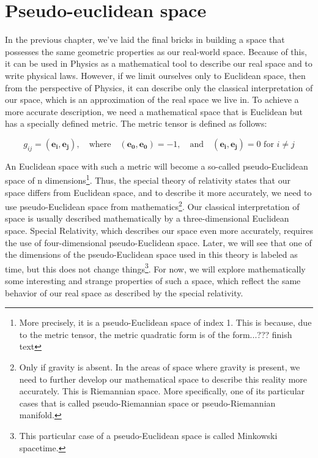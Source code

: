 \documentclass{book}
\begin{document}
\chapter{Pseudo-euclidean space}

In the previous chapter, we've laid the final bricks in building a space that possesses the same geometric properties as our real-world space. Because of this, it can be used in Physics as a mathematical tool to describe our real space and to write physical laws. However, if we limit ourselves only to Euclidean space, then from the perspective of Physics, it can describe only the classical interpretation of our space, which is an approximation of the real space we live in. To achieve a more accurate description, we need a mathematical space that is Euclidean but has a specially defined metric. The metric tensor is defined as follows:

\[g_{ij} = (\boldsymbol{e_i}, \boldsymbol{e_j}), \quad \text{where} \quad (\boldsymbol{e_0}, \boldsymbol{e_0}) = -1, \quad \text{and} \quad (\boldsymbol{e_i}, \boldsymbol{e_j}) = 0 \text{ for } i \neq j\]

An Euclidean space with such a metric will become a so-called pseudo-Euclidean space of n dimensions\footnote{More precisely, it is a pseudo-Euclidean space of index 1. This is because, due to the metric tensor, the metric quadratic form is of the form...??? finish text }. Thus, the special theory of relativity states that our space differs from Euclidean space, and to describe it more accurately, we need to use pseudo-Euclidean space from mathematics\footnote{Only if gravity is absent. In the areas of space where gravity is present, we need to further develop our mathematical space to describe this reality more accurately. This is Riemannian space. More specifically, one of its particular cases that is called pseudo-Riemannian space or pseudo-Riemannian manifold.}. Our classical interpretation of space is usually described mathematically by a three-dimensional Euclidean space. Special Relativity, which describes our space even more accurately, requires the use of four-dimensional pseudo-Euclidean space. Later, we will see that one of the dimensions of the pseudo-Euclidean space used in this theory is labeled as time, but this does not change things\footnote{This particular case of a pseudo-Euclidean space is called Minkowski spacetime.}. For now, we will explore mathematically some interesting and strange properties of such a space, which reflect the same behavior of our real space as described by the special relativity.
\end{document}
